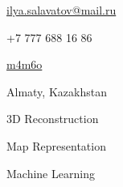 \documentclass[11pt]{spidercv}
\begin{document}
    \begin{TopBar}{\ColorTextSide}

        \begin{DoubleColumns}
            \begin{ItemList}{\ColorHighlight}
                \item [\Large\faAt] \href{mailto:ilya.salavatov@mail.ru}{ilya.salavatov@mail.ru}
                \item [\Large\faMobile] +7 777 688 16 86
            \end{ItemList}
            \nextcolumn
            \begin{ItemList}{\ColorHighlight}
                \item [\Large\faGithub] \href{https://github.com/m4m6o}{m4m6o}
                \item [\Large\faMapMarker] Almaty, Kazakhstan
            \end{ItemList}
        \end{DoubleColumns}

        \begin{TripleColumns}
            \begin{ItemList}{\ColorHighlight}
                \item [] 3D Reconstruction
            \end{ItemList}
            \nextcolumn
            \begin{ItemList}{\ColorHighlight}
                \item [] Map Representation
            \end{ItemList}
            \nextcolumn
            \begin{ItemList}{\ColorHighlight}
                \item [] Machine Learning
            \end{ItemList}
        \end{TripleColumns}
    \end{TopBar}
\end{document}
